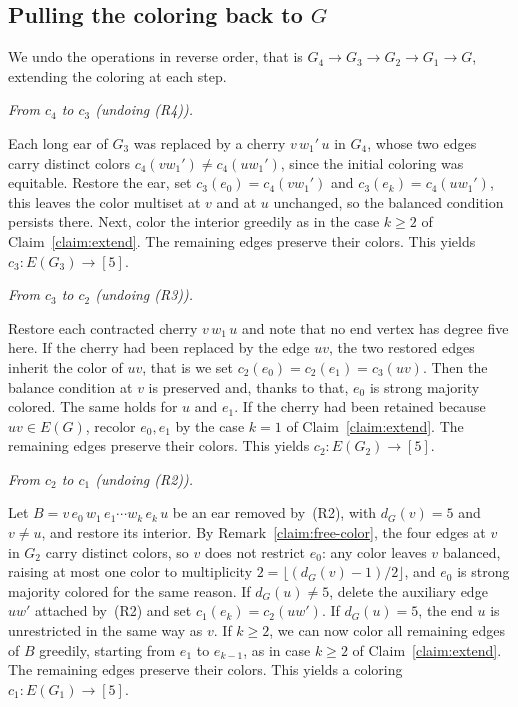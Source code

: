 \documentclass[11pt]{article}
\theoremstyle{definition}
\begin{document}
\subsection*{Pulling the coloring back to $G$}

We undo the operations in reverse order, that is $G_4\to G_3\to G_2\to G_1\to G$, extending the coloring at each step.

\smallskip
\emph{From $c_4$ to $c_3$ (undoing (R4)).}
\smallskip

Each long ear of $G_3$ was replaced by a cherry $v\,w_1'\,u$ in $G_4$, whose two edges carry distinct colors $c_4(vw_1')\neq c_4(uw_1')$, since the initial coloring was equitable. Restore the ear, set $c_3(e_0)=c_4(vw_1')$ and $c_3(e_k)=c_4(uw_1')$,  this leaves the color multiset at $v$ and at $u$ unchanged, so the balanced condition persists there. Next, color the interior greedily as in the case $k\ge 2$ of Claim~\ref{claim:extend}. The remaining edges preserve their colors. This yields $c_3\colon E(G_3)\to[5]$.

\smallskip
\emph{From $c_3$ to $c_2$ (undoing (R3)).}
\smallskip

Restore each contracted cherry $v\,w_1\,u$ and note that no end vertex has degree five here. If the cherry had been replaced by the edge $uv$, the two restored edges inherit the color of $uv$, that is we set $c_2(e_0)=c_2(e_1)=c_3(uv)$. Then the balance condition at $v$ is preserved and, thanks to that, $e_0$ is strong majority colored. The same holds for $u$ and $e_1$. If the cherry had been retained because $uv\in E(G)$, recolor $e_0, e_1$ by the case $k=1$ of Claim~\ref{claim:extend}. The remaining edges preserve their colors. This yields $c_2\colon E(G_2)\to[5]$.

\smallskip
\emph{From $c_2$ to $c_1$ (undoing (R2)).}
\smallskip

Let $B=v\,e_0\,w_1\,e_1\cdots w_k\,e_k\,u$ be an ear removed by~(R2), with $d_G(v)=5$ and $v\neq u$, and restore its interior. By Remark~\ref{claim:free-color}, the four edges at $v$ in $G_2$ carry distinct colors, so $v$ does not restrict $e_0$: any color leaves $v$ balanced, raising at most one color to multiplicity $2=\lfloor(d_G(v)-1)/2\rfloor$, and $e_0$ is strong majority colored for the same reason. If $d_G(u)\neq 5$, delete the auxiliary edge $uw'$ attached by~(R2) and set $c_1(e_k)=c_2(uw')$. If $d_G(u)=5$, the end $u$ is unrestricted in the same way as $v$. If $k\geq 2$, we can now color all remaining edges of $B$ greedily, starting from $e_1$ to $e_{k-1}$, as in case $k\geq 2$ of Claim~\ref{claim:extend}. The remaining edges preserve their colors. This yields a coloring $c_1\colon E(G_1)\to[5]$.
\end{document}
